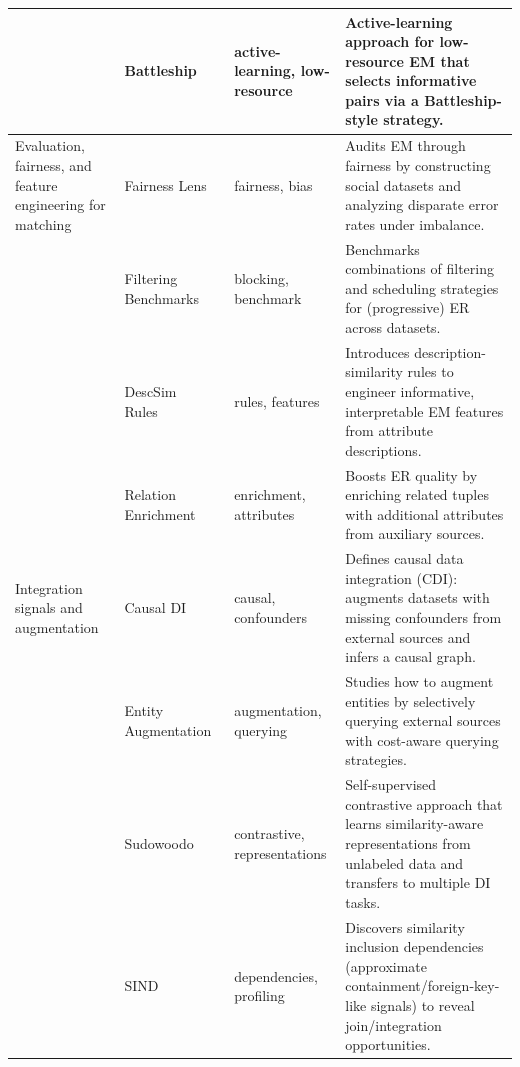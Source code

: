 \documentclass[sigconf,nonacm]{acmart}
\begin{document}
\begin{table}[!htbp]
\begin{tabularx}{\textwidth}{@{}p{24mm}p{28mm}p{18mm}Y@{}}
~ &
Battleship~\cite{10.1145/3626711} &
active-learning, low-resource &
Active-learning approach for low-resource EM that selects informative pairs via a Battleship-style strategy. \\

\midrule

Evaluation, fairness, and feature engineering for matching &
Fairness Lens~\cite{10.14778/3611479.3611525} &
fairness, bias &
Audits EM through fairness by constructing social datasets and analyzing disparate error rates under imbalance. \\

~ &
Filtering Benchmarks~\cite{10184692} &
blocking, benchmark &
Benchmarks combinations of filtering and scheduling strategies for (progressive) ER across datasets. \\

~ &
DescSim Rules~\cite{11112979} &
rules, features &
Introduces description-similarity rules to engineer informative, interpretable EM features from attribute descriptions. \\

~ &
Relation Enrichment~\cite{10.14778/3681954.3681987} &
enrichment, attributes &
Boosts ER quality by enriching related tuples with additional attributes from auxiliary sources. \\

\midrule

Integration signals and augmentation &
Causal DI~\cite{10.14778/3603581.3603602} &
causal, confounders &
Defines causal data integration (CDI): augments datasets with missing confounders from external sources and infers a causal graph. \\

~ &
Entity Augmentation~\cite{10.14778/3611479.3611535} &
augmentation, querying &
Studies how to augment entities by selectively querying external sources with cost-aware querying strategies. \\

~ &
Sudowoodo~\cite{10184556} &
contrastive, representations &
Self-supervised contrastive approach that learns similarity-aware representations from unlabeled data and transfers to multiple DI tasks. \\

~ &
SIND~\cite{10.1145/3588929} &
dependencies, profiling &
Discovers similarity inclusion dependencies (approximate containment/foreign-key-like signals) to reveal join/integration opportunities. \\

\bottomrule
\end{tabularx}
\end{table}
\end{document}
